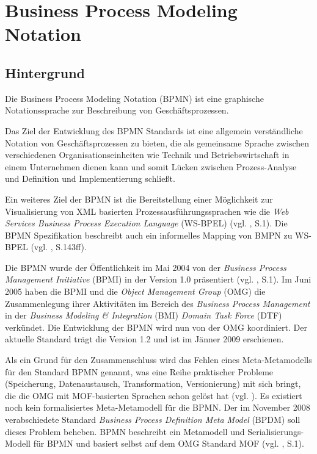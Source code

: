 \section{Business Process Modeling Notation}\label{mod-bpmn}

\subsection{Hintergrund}
Die Business Process Modeling Notation (BPMN) ist eine graphische Notationssprache zur Beschreibung von Geschäftsprozessen.

Das Ziel der Entwicklung des BPMN Standards ist eine allgemein verständliche Notation von Geschäftsprozessen zu bieten, die als gemeinsame Sprache zwischen verschiedenen Organisationseinheiten wie Technik und Betriebswirtschaft in einem Unternehmen dienen kann und somit Lücken zwischen Prozess-Analyse und Definition und Implementierung schließt.

Ein weiteres Ziel der BPMN ist die Bereitstellung einer Möglichkeit zur Visualisierung von XML basierten Prozessausführungssprachen wie die \emph{Web Services Business Process Execution Language} (WS-BPEL) (vgl. \citep{BPMN2009}, S.1). Die BPMN Spezifikation beschreibt auch ein informelles Mapping von BMPN zu WS-BPEL (vgl. \citep{BPMN2009}, S.143ff).

Die BPMN wurde der Öffentlichkeit im Mai 2004 von der \emph{Business Process Management Initiative} (BPMI) in der Version 1.0 präsentiert (vgl. \citep{White2004}, S.1). Im Juni 2005 haben die BPMI und die \emph{Object Management Group} (OMG) die Zusammenlegung ihrer Aktivitäten im Bereich des \emph{Business Process Management} in der \emph{Business Modeling \& Integration} (BMI) \emph{Domain Task Force} (DTF) verkündet. Die Entwicklung der BPMN wird nun von der OMG koordiniert. Der aktuelle Standard trägt die Version 1.2 und ist im Jänner 2009 erschienen.

Als ein Grund für den Zusammenschluss wird das Fehlen eines Meta-Metamodells für den Standard BPMN genannt, was eine Reihe praktischer Probleme (Speicherung, Datenaustausch, Transformation, Versionierung) mit sich bringt, die die OMG mit MOF-basierten Sprachen schon gelöst hat (vgl. \citep{Gilbert2007}). Es existiert noch kein formalisiertes Meta-Metamodell für die BPMN. Der im November 2008 verabschiedete Standard \emph{Business Process Definition Meta Model} (BPDM) soll dieses Problem beheben. BPMN beschreibt ein Metamodell und Serialisierungs-Modell für BPMN und basiert selbst auf dem OMG Standard MOF (vgl. \citep{BPDM2008}, S.1).

